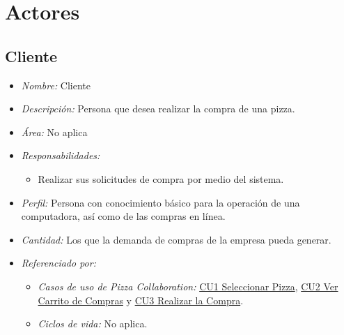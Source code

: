 
\pagebreak
\section{Actores}

	\hypertarget{A:Cliente}{}
	\subsection{Cliente}

		\begin{itemize}
			
			\item \textit{Nombre:} Cliente %
			
			\item \textit{Descripción:} Persona que desea realizar la compra de una pizza.
			
			\item \textit{Área:} No aplica
			
			\item \textit{Responsabilidades:}

				\begin{itemize}
					\item Realizar sus solicitudes de compra por medio del sistema.
				\end{itemize}

			\item \textit{Perfil:} Persona con conocimiento básico para la operación de una computadora, así como de las compras en línea.
			
			\item \textit{Cantidad:} Los que la demanda de compras de la empresa pueda generar.

			\item \textit{Referenciado por:} 
		

				\begin{itemize}
					
					\item \textit{Casos de uso de Pizza Collaboration:} \hyperlink{CU1}{CU1 Seleccionar Pizza}, \hyperlink{CU2}{CU2 Ver Carrito de Compras} y \hyperlink{CU3}{CU3 Realizar la Compra}.

					\item \textit{Ciclos de vida:} No aplica.

				\end{itemize}

		\end{itemize}

